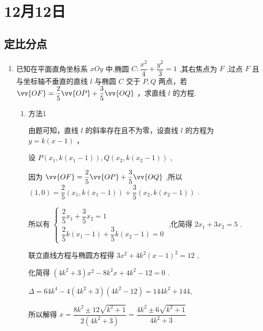 \section*{12月12日}
\subsection*{定比分点}
\begin{enumerate}
    \item 已知在平面直角坐标系 ${xOy}$ 中,椭圆 $C : \dfrac{{x}^{2}}{4} + \dfrac{{y}^{2}}{3} = 1$ ,其右焦点为 $F$ ,过点 $F$ 且与坐标轴不垂直的直线 $l$ 与椭圆 $C$ 交于 $P,Q$ 两点，若 $\vv{OF} = \dfrac{2}{5}\vv{OP} + \dfrac{3}{5}\vv{OQ}$ ，求直线 $l$ 的方程.
    \begin{jieda}

        \begin{enumerate}
            \item 方法1
                
            由题可知，直线 $l$ 的斜率存在且不为零，设直线 $l$ 的方程为 $y = k\left( {x - 1}\right)$ ，
            
            设 $P\left( {{x}_{1},k\left( {{x}_{1} - 1}\right) }\right) ,Q\left( {{x}_{2},k\left( {{x}_{2} - 1}\right) }\right)$ ,
            
            因为 $\vv{OF} = \dfrac{2}{5}\vv{OP} + \dfrac{3}{5}\vv{OQ}$ ,所以 $\left( {1,0}\right)  = \dfrac{2}{5}\left( {{x}_{1},k\left( {{x}_{1} - 1}\right) }\right)  + \dfrac{3}{5}\left( {{x}_{2},k\left( {{x}_{2} - 1}\right) }\right)$ .
            
            所以有 $\left\{  \begin{array}{l} \dfrac{2}{5}{x}_{1} + \dfrac{3}{5}{x}_{2} = 1 \\  \dfrac{2}{5}k\left( {{x}_{1} - 1}\right)  + \dfrac{3}{5}k\left( {{x}_{2} - 1}\right)  = 0 \end{array}\right.$ ,化简得 $2{x}_{1} + 3{x}_{2} = 5$ .

            联立直线方程与椭圆方程得 $3{x}^{2} + 4{k}^{2}{\left( x - 1\right) }^{2} = {12}$ ,
            
            化简得 $\left( {4{k}^{2} + 3}\right) {x}^{2} - 8{k}^{2}x + 4{k}^{2} - {12} = 0$ .
            
            $\Delta  = {64}{k}^{4} - 4\left( {4{k}^{2} + 3}\right) \left( {4{k}^{2} - {12}}\right)  = {144}{k}^{2} + {144},$
            
            所以解得 $x = \dfrac{8{k}^{2} \pm  {12}\sqrt{{k}^{2} + 1}}{2\left( {4{k}^{2} + 3}\right) } = \dfrac{4{k}^{2} \pm  6\sqrt{{k}^{2} + 1}}{4{k}^{2} + 3}$
            

\end{enumerate}
\end{jieda}
\end{enumerate}
